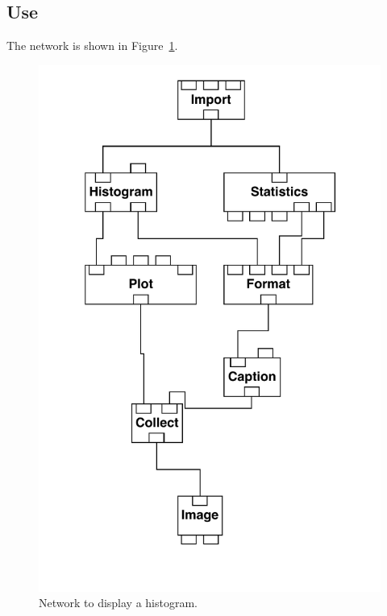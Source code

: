 \documentclass[twoside,11pt]{starlink}
\begin{document}
\subsection{Use}

The network is shown in Figure~\ref{HISTNETF}.

\begin{figure}[htbp]

\begin{center}
\leavevmode
\includegraphics[width=371pt]{sc2_histogram}
\end{center}

\caption[Network to display a histogram.]{Network to display a histogram.
\label{HISTNETF} }

\end{figure}
\end{document}
